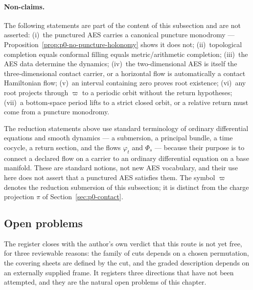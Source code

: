 \paragraph{Non-claims.}  The following statements are part of the content of this
subsection and are not asserted: (i)~the punctured AES carries a canonical
puncture monodromy --- Proposition~\ref{prop:p0-no-puncture-holonomy} shows it
does not; (ii)~topological completion equals conformal filling equals
metric/arithmetic completion; (iii)~the AES data determine the dynamics;
(iv)~the two-dimensional AES is itself the three-dimensional contact carrier, or a
horizontal flow is automatically a contact Hamiltonian flow; (v)~an interval
containing zero proves root existence; (vi)~any root projects through $\varpi$ to a
periodic orbit without the return hypotheses; (vii)~a bottom-space period lifts to
a strict closed orbit, or a relative return must come from a puncture monodromy.

\begin{remark}
\label{rem:p0-punctured-flow-terminology}
The reduction statements above use standard terminology of ordinary differential
equations and smooth dynamics --- a submersion, a principal bundle, a time
cocycle, a return section, and the flows $\varphi_t$ and $\Phi_s$ --- because
their purpose is to connect a declared flow on a carrier to an ordinary
differential equation on a base manifold.  These are standard notions, not new
AES vocabulary, and their use here does not assert that a punctured AES satisfies
them.  The symbol $\varpi$ denotes the reduction submersion of this subsection;
it is distinct from the charge projection $\pi$ of
Section~\ref{sec:p0-contact}.
\end{remark}

\subsection{Open problems}
\label{subsec:p0-holed-open}

The register closes with the author's own verdict that this route is not yet
free, for three reviewable reasons: the family of cuts depends on a chosen
permutation, the covering sheets are defined by the cut, and the graded
description depends on an externally supplied frame.  It registers three
directions that have not been attempted, and they are the natural open problems
of this chapter.

